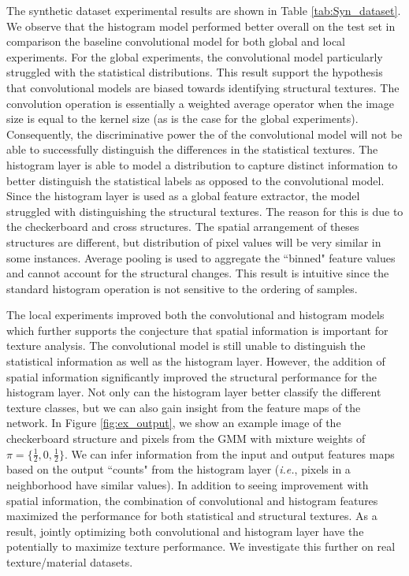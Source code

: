 \documentclass[journal]{IEEEtai}
\begin{document}
The synthetic dataset experimental results are shown in Table {\ref{tab:Syn_dataset}}. We observe that the histogram model performed better overall on the test set in comparison the baseline convolutional model for both global and local experiments. For the global experiments, the convolutional model particularly struggled with the statistical distributions. This result support the hypothesis that convolutional models are biased towards identifying structural textures. The convolution operation is essentially a weighted average operator when the image size is equal to the kernel size (as is the case for the global experiments). Consequently, the discriminative power the of the convolutional model will not be able to successfully distinguish the differences in the statistical textures. The histogram layer is able to model a distribution to capture distinct information to better distinguish the statistical labels as opposed to the convolutional model. Since the histogram layer is used as a global feature extractor, the model struggled with distinguishing the structural textures. The reason for this is due to the checkerboard and cross structures. The spatial arrangement of theses structures are different, but distribution of pixel values will be very similar in some instances. Average pooling is used to aggregate the ``binned" feature values and cannot account for the structural changes. This result is intuitive since the standard histogram operation is not sensitive to the ordering of samples.

The local experiments improved both the convolutional and histogram models which further supports the conjecture that spatial information is important for texture analysis. The convolutional model is still unable to distinguish the statistical information as well as the histogram layer. However, the addition of spatial information significantly improved the structural performance for the histogram layer. Not only can the histogram layer better classify the different texture classes, but we can also gain insight from the feature maps of the network. In Figure {\ref{fig:ex_output}}, we show an example image of the checkerboard structure and pixels from the GMM with mixture weights of  $\pi = \{\frac{1}{2}, 0, \frac{1}{2}\}$. We can infer information from the input and output features maps based on the output ``counts" from the histogram layer ({\textit{i.e.}}, pixels in a neighborhood have similar values). In addition to seeing improvement with spatial information, the combination of convolutional and histogram features maximized the performance for both statistical and structural textures. As a result, jointly optimizing both convolutional and histogram layer have the potentially to maximize texture performance. We investigate this further on real texture/material datasets. 
\end{document}

